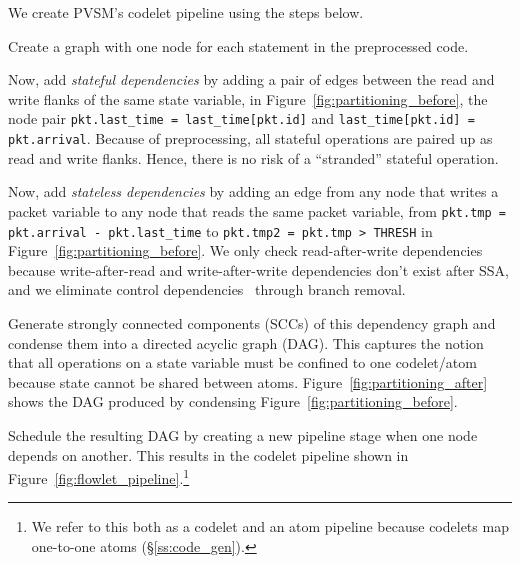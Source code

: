 We create PVSM's codelet pipeline using the steps below.
\begin{CompactEnumerate}
  \item Create a graph with one node for each statement in the preprocessed code.
  \item Now, add {\em stateful dependencies} by adding a pair of edges between
    the read and write flanks of the same state variable, \eg in
    Figure~\ref{fig:partitioning_before}, the node pair {\tt pkt.last\_time =
    last\_time[pkt.id]} and {\tt last\_time[pkt.id] = pkt.arrival}. Because of
    preprocessing, all stateful operations are paired up as read and write flanks.
    Hence, there is no risk of a ``stranded'' stateful operation.
  \item Now, add {\em stateless dependencies} by adding an edge from any node
    that writes a packet variable to any node that reads the same packet variable,
    \eg from {\tt pkt.tmp = pkt.arrival - pkt.last\_time} to {\tt pkt.tmp2 =
    pkt.tmp > THRESH} in Figure~\ref{fig:partitioning_before}. We only check read-after-write dependencies because
    write-after-read and write-after-write dependencies don't exist after SSA, and
    we eliminate control dependencies~\cite{ssa} through branch removal.
  \item Generate strongly connected components (SCCs) of this dependency graph
    and condense them into a directed acyclic graph (DAG). This captures the notion that all
    operations on a state variable must be confined to one codelet/atom because
    state cannot be shared between atoms. Figure~\ref{fig:partitioning_after}
    shows the DAG produced by condensing Figure~\ref{fig:partitioning_before}.
  \item Schedule the resulting DAG by creating a new pipeline stage when one
    node depends on another. This results in the codelet pipeline
    shown in Figure~\ref{fig:flowlet_pipeline}.\footnote{We refer to this both
    as a codelet and an atom pipeline because codelets map one-to-one atoms
  (\S\ref{ss:code_gen}).}
\end{CompactEnumerate}

